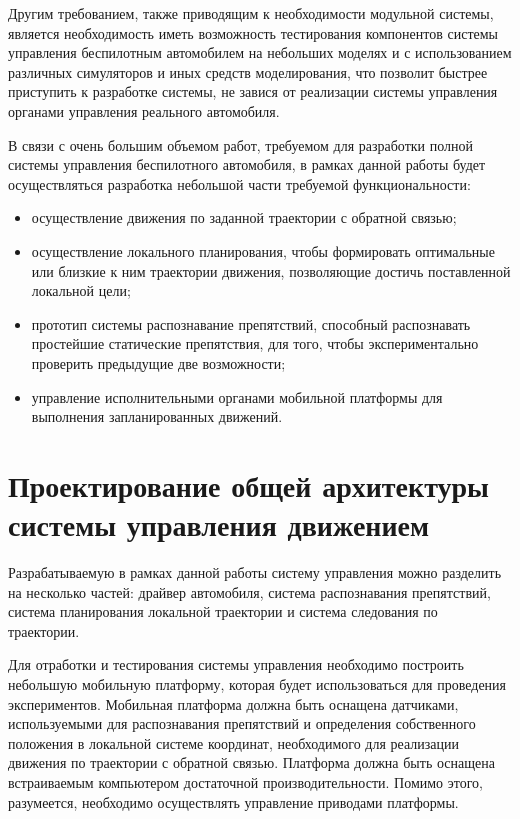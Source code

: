 Другим требованием, также приводящим к необходимости модульной системы, является необходимость иметь возможность
тестирования компонентов системы управления беспилотным автомобилем на небольших моделях и с использованием различных
симуляторов и иных средств моделирования, что позволит быстрее приступить
к разработке системы, не завися от реализации системы управления органами управления реального автомобиля.

В связи с очень большим объемом работ, требуемом для разработки полной системы управления беспилотного автомобиля, в
рамках данной работы будет осуществляться разработка небольшой части требуемой функциональности:
\begin{itemize}
    \item осуществление движения по заданной траектории с обратной связью;
    \item осуществление локального планирования, чтобы формировать оптимальные или близкие к ним траектории движения,
          позволяющие достичь поставленной локальной цели;
    \item прототип системы распознавание препятствий, способный распознавать простейшие статические препятствия,
          для того, чтобы экспериментально проверить предыдущие две возможности;
    \item управление исполнительными органами мобильной платформы для выполнения запланированных движений.
\end{itemize}

\section{Проектирование общей архитектуры системы управления движением}

Разрабатываемую в рамках данной работы систему управления можно разделить на несколько частей: драйвер автомобиля,
система распознавания препятствий, система планирования локальной траектории и система следования по траектории.

Для отработки и тестирования системы управления необходимо построить небольшую мобильную платформу, которая будет
использоваться для проведения экспериментов. Мобильная платформа должна быть оснащена датчиками, используемыми для
распознавания препятствий и определения собственного положения в локальной системе координат, необходимого для
реализации движения по траектории с обратной связью. Платформа должна быть оснащена встраиваемым компьютером достаточной
производительности. Помимо этого, разумеется, необходимо осуществлять управление приводами платформы.

